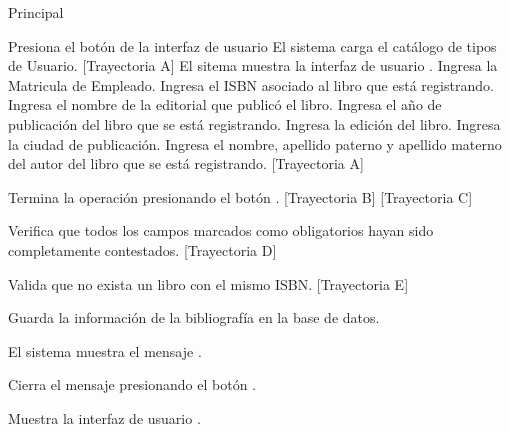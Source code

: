 \begin{UCtrayectoria}{Principal}

    \UCpaso[\UCactor] Presiona el botón  de la interfaz de usuario 
    \UCpaso El sistema carga el catálogo de tipos de Usuario. [Trayectoria A]
    \UCpaso El sitema muestra la interfaz de usuario .
    \UCpaso[\UCactor] Ingresa la Matricula de Empleado.
    \UCpaso[\UCactor] Ingresa el ISBN asociado al libro que está registrando.
    \UCpaso[\UCactor] Ingresa el nombre de la editorial que publicó el libro.
    \UCpaso[\UCactor] Ingresa el año de publicación del libro que se está registrando.
    \UCpaso[\UCactor] Ingresa la edición del libro.
    \UCpaso[\UCactor] Ingresa la ciudad de publicación.
    \UCpaso[\UCactor] Ingresa el nombre, apellido paterno y apellido materno  del autor del libro que se está registrando. [Trayectoria A]


    \UCpaso[\UCactor] Termina la operación presionando el botón . [Trayectoria B] [Trayectoria C]

    \UCpaso Verifica que todos los campos marcados como obligatorios hayan sido completamente contestados. [Trayectoria D]

    \UCpaso Valida que no exista un libro con el mismo ISBN. [Trayectoria E]

    \UCpaso Guarda la información de la bibliografía en la base de datos.

    \UCpaso El sistema muestra el mensaje .

    \UCpaso[\UCactor] Cierra el mensaje presionando el botón .

    \UCpaso Muestra la interfaz de usuario .
\end{UCtrayectoria}


\begin{comment}
\begin{UCtrayectoriaA}{A}{El sistema no encuentra ningún formulario para mostrar.}
    \UCpaso No encuentra ningún formulario para mostrar.
    \UCpaso El sistema muestra el mensaje \MSGref{MSG6}{Por el momento no se puede registrar la bibliografía}.
    \UCpaso[\UCactor] Cierra el mensaje presionando el botón \IUbutton{Aceptar}.
    \UCpaso Continua en el paso 1 de la trayectoria principal del \UCref{CU1}.
\end{UCtrayectoriaA}
\end{comment}


